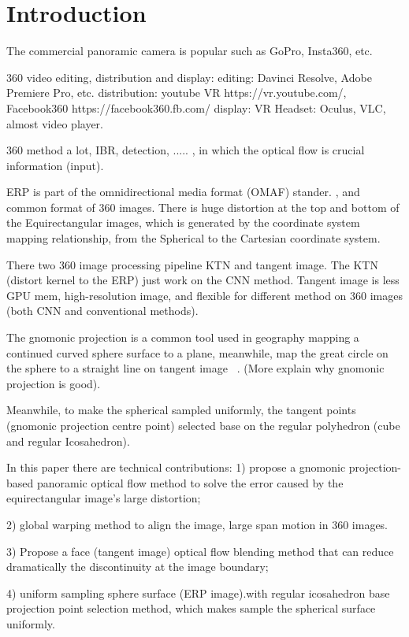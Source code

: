 \section{Introduction}
\label{sec:intro}

The commercial panoramic camera is popular such as GoPro, Insta360, etc.

360 video editing, distribution and display:
editing: Davinci Resolve, Adobe Premiere Pro, etc.
distribution: youtube VR https://vr.youtube.com/, Facebook360 https://facebook360.fb.com/
display: VR Headset: Oculus, VLC, almost video player.

360 method a lot, IBR, detection, ..... \cite{omniphoto, }, in which the optical flow is crucial information (input).

ERP is part of the omnidirectional media format (OMAF) stander. \cite{hannuksela2019overview}, and common format of 360 images.
There is huge distortion at the top and bottom of the Equirectangular images, which is generated by the coordinate system mapping relationship, from the Spherical to the Cartesian coordinate system.

There two 360 image processing pipeline KTN and tangent image.
The KTN (distort kernel to the ERP) just work on the CNN method.
Tangent image is less GPU mem, high-resolution image, and flexible for different method on 360 images (both CNN and conventional methods).

The gnomonic projection is a common tool used in geography mapping a continued curved sphere surface to a plane, meanwhile, map the great circle on the sphere to a straight line on tangent image ~\cite{gnomic_projection}. (More explain why gnomonic projection is good).

Meanwhile, to make the spherical sampled uniformly, the tangent points (gnomonic projection centre point) selected base on the regular polyhedron (cube and regular Icosahedron).

In this paper there are technical contributions:
1) propose a gnomonic projection-based panoramic optical flow method to solve the error caused by the equirectangular image's large distortion;

2) global warping method to align the image, large span motion in 360 images.

3) Propose a face (tangent image) optical flow blending method that can reduce dramatically the discontinuity at the image boundary;

4) uniform sampling sphere surface (ERP image).with regular icosahedron base projection point selection method, which makes sample the spherical surface uniformly.
